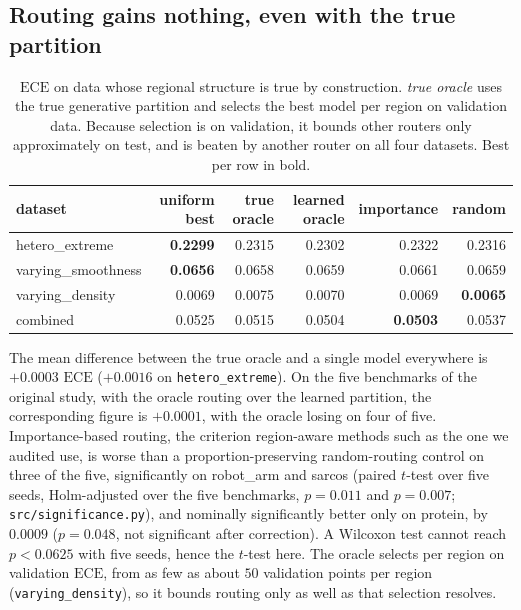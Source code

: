 \documentclass[11pt]{article}
\newcommand{\ece}{\mathrm{ECE}}
\begin{document}
\subsection{Routing gains nothing, even with the true partition}
\label{sec:routing}

\begin{table}[h]\centering
\caption{$\ece$ on data whose regional structure is true by construction. \emph{true
oracle} uses the true generative partition and selects the best model per region on
validation data. Because selection is on validation, it bounds other routers only
approximately on test, and is beaten by another router on all four datasets.
Best per row in bold.}
\label{tab:routing}
\begin{tabular}{lrrrrr}
\toprule
dataset & uniform best & true oracle & learned oracle & importance & random \\
\midrule
hetero\_extreme & \textbf{0.2299} & 0.2315 & 0.2302 & 0.2322 & 0.2316 \\
varying\_smoothness & \textbf{0.0656} & 0.0658 & 0.0659 & 0.0661 & 0.0659 \\
varying\_density & 0.0069 & 0.0075 & 0.0070 & 0.0069 & \textbf{0.0065} \\
combined & 0.0525 & 0.0515 & 0.0504 & \textbf{0.0503} & 0.0537 \\
\bottomrule
\end{tabular}
\end{table}

The mean difference between the true oracle and a single model everywhere is
$+0.0003$ $\ece$ ($+0.0016$ on \texttt{hetero\_extreme}). On the five benchmarks of the original study,
with the oracle routing over the learned partition, the corresponding figure is
$+0.0001$, with the oracle losing on four of five.
Importance-based routing, the criterion region-aware methods such as the one we
audited use, is worse than a proportion-preserving random-routing control on three of
the five, significantly on robot\_arm and sarcos (paired $t$-test over five seeds,
Holm-adjusted over the five benchmarks, $p=0.011$ and $p=0.007$;
\texttt{src/significance.py}), and nominally significantly better only on protein, by $0.0009$
($p=0.048$, not significant after correction). A Wilcoxon test cannot reach $p<0.0625$
with five seeds, hence the $t$-test here. The oracle selects per region on validation
$\ece$, from as few as about $50$ validation points per region
(\texttt{varying\_density}), so it bounds routing only as well
as that selection resolves.
\end{document}
